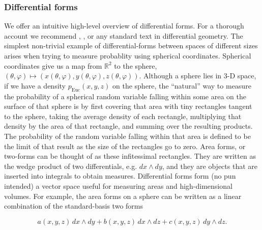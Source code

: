 \documentclass{article}
\begin{document}
\subsubsection{Differential forms}\label{differentialFormsSection}

We offer an intuitive high-level overview of differential forms. For a thorough account we recommend \citet{muirhead2009aspects}, \citet{edelman200518}, or any standard text in differential geometry. The simplest non-trivial example of differential-forms between spaces of different sizes arises when trying to measure probablity using spherical coordinates. Spherical coordinates give us a map from $\mathbb{R}^2$ to the sphere, $(\theta, \varphi) \mapsto (x(\theta,\varphi), y(\theta,\varphi), z(\theta,\varphi))$. Although a sphere lies in 3-D space, if we have a density $p_\mathrm{Euc}(x,y,z)$ on the sphere, the ``natural'' way to measure the probability of a spherical random variable falling within some area on the surface of that sphere is by first covering that area with tiny rectangles tangent to the sphere, taking the average density of each rectangle, multiplying that density by the area of that rectangle, and summing over the resulting products. The probability of the random variable falling within that area is defined to be the limit of that result as the size of the rectangles go to zero. Area forms, or two-forms can be thought of as these infitessimal rectangles. They are written as the wedge product of two differentials, e.g. $dx \wedge dy$, and they are objects that are inserted into integrals to obtain measures. Differential forms form (no pun intended) a vector space useful for measuring areas and high-dimensional volumes. For example, the area forms on a sphere can be written as a linear combination of the standard-basis two forms

\begin{equation}
\label{eq:EuclideanAreaForm}
a(x,y,z)\, dx \wedge dy + b(x,y,z)\, dx \wedge dz + c(x,y,z)\, dy \wedge dz.
\end{equation}
\end{document}
